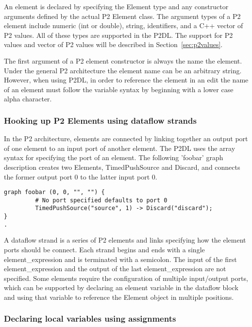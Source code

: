 \documentclass{article}
\begin{document}
An element is declared by specifying the Element type and any constructor arguments
defined by the actual P2 Element class. The argument types of a P2 element include
numeric (int or double), string, identifiers, and a C++ vector of P2 values. 
All of these types are supported in the P2DL. The support for P2 values and vector 
of P2 values will be described in Section~\ref{sec:p2values}. 

The first argument of a P2 element constructor is always the name the element. 
Under the general P2 architecture the element name can be
an arbitrary string. However, when using P2DL, in order to reference the element in an
edit the name of an element must follow the variable syntax by beginning with a lower
case alpha character.

\subsubsection{Hooking up P2 Elements using dataflow strands}

In the P2 architecture, elements are connected by linking together an output port
of one element to an input port of another element. The P2DL uses the array syntax
for specifying the port of an element. The following 'foobar'
graph description creates two Elements, TimedPushSource and Discard, and connects
the former output port 0 to the latter input port 0.

\begin{verbatim}
graph foobar (0, 0, "", "") {
         # No port specified defaults to port 0
         TimedPushSource("source", 1) -> Discard("discard");
}
.
\end{verbatim}

A dataflow strand is a series of P2 elements and links specifying how the element
ports should be connect. Each strand begins and ends with a single element\_expression
and is terminated with a semicolon. The input of the first element\_expression
and the output of the last element\_expression are not specified. Some elements 
require the configuration of multiple input/output ports, which can be supported by
declaring an element variable in the dataflow block and using that variable to reference
the Element object in multiple positions. 

\subsubsection{Declaring local variables using assignments}
\end{document}
